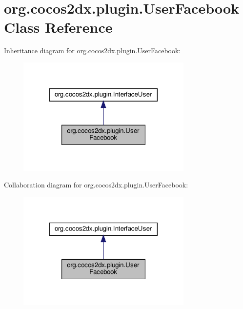 \hypertarget{classorg_1_1cocos2dx_1_1plugin_1_1UserFacebook}{}\section{org.\+cocos2dx.\+plugin.\+User\+Facebook Class Reference}
\label{classorg_1_1cocos2dx_1_1plugin_1_1UserFacebook}


Inheritance diagram for org.\+cocos2dx.\+plugin.\+User\+Facebook\+:
\nopagebreak
\begin{figure}[H]
\begin{center}
\leavevmode
\includegraphics[width=246pt]{classorg_1_1cocos2dx_1_1plugin_1_1UserFacebook__inherit__graph}
\end{center}
\end{figure}


Collaboration diagram for org.\+cocos2dx.\+plugin.\+User\+Facebook\+:
\nopagebreak
\begin{figure}[H]
\begin{center}
\leavevmode
\includegraphics[width=246pt]{classorg_1_1cocos2dx_1_1plugin_1_1UserFacebook__coll__graph}
\end{center}
\end{figure}
